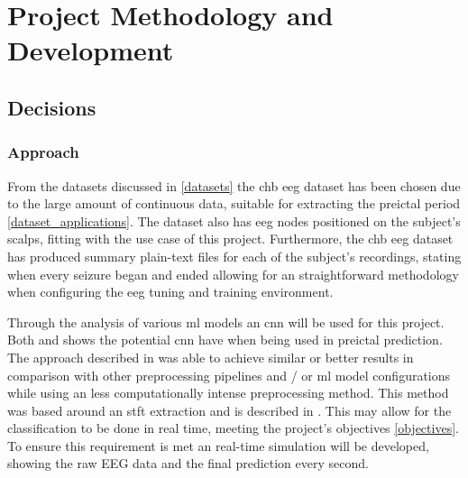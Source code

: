 \documentclass[12pt]{article}
\begin{document}
\section{Project Methodology and Development}\label{development}

\subsection{Decisions}

\subsubsection{Approach}

From the datasets discussed in \ref{datasets} the \acrfull{chb} \acrshort{eeg} dataset has been chosen due to the large amount of continuous data, suitable for extracting the preictal period \ref{dataset_applications}. The dataset also has \acrshort{eeg} nodes positioned on the subject's scalps, fitting with the use case of this project. Furthermore, the \acrshort{chb} \acrshort{eeg} dataset has produced summary plain-text files for each of the subject's recordings, stating when every seizure began and ended allowing for an straightforward methodology when configuring the \acrshort{eeg} tuning and training environment. 

Through the analysis of various \acrshort{ml} models an \acrshort{cnn} will be used for this project. Both \cite{truong2018convolutional} and \cite{mirowski2009classification} shows the potential \acrshort{cnn} have when being used in preictal prediction. The approach described in \cite{truong2018convolutional} was able to achieve similar or better results in comparison with other preprocessing pipelines and / or \acrshort{ml} model configurations while using an less computationally intense preprocessing method. This method was based around an \acrshort{stft} extraction and is described in \cite{truong2018convolutional}. This may allow for the classification to be done in real time, meeting the project's objectives \ref{objectives}. To ensure this requirement is met an real-time simulation will be developed, showing the raw EEG data and the final prediction every second. 
\end{document}
